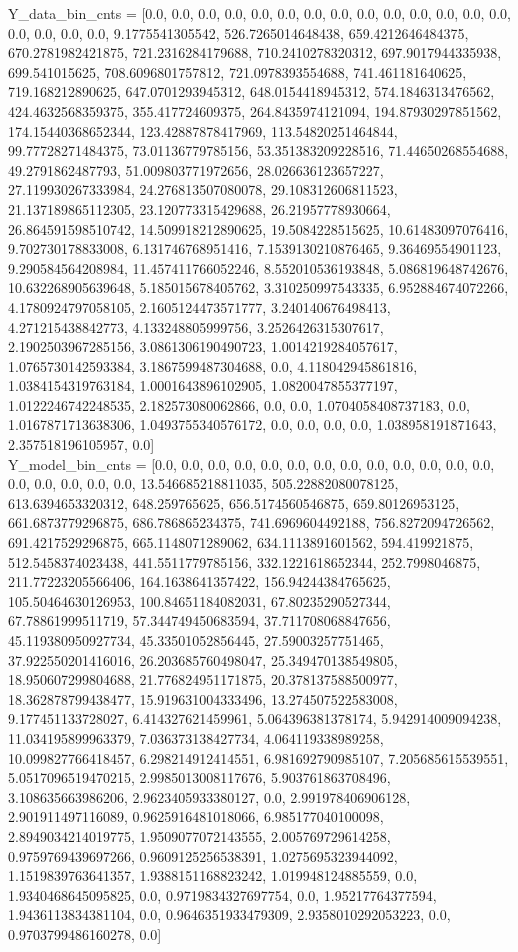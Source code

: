 \documentclass[12pt]{article}
\begin{document}
	Y\_data\_bin\_cnts = [0.0, 0.0, 0.0, 0.0, 0.0, 0.0, 0.0, 0.0, 0.0, 0.0, 0.0, 0.0, 0.0, 0.0, 0.0, 0.0, 0.0, 0.0, 9.1775541305542, 526.7265014648438, 659.4212646484375, 670.2781982421875, 721.2316284179688, 710.2410278320312, 697.9017944335938, 699.541015625, 708.6096801757812, 721.0978393554688, 741.461181640625, 719.168212890625, 647.0701293945312, 648.0154418945312, 574.1846313476562, 424.4632568359375, 355.417724609375, 264.8435974121094, 194.87930297851562, 174.15440368652344, 123.42887878417969, 113.54820251464844, 99.77728271484375, 73.01136779785156, 53.351383209228516, 71.44650268554688, 49.2791862487793, 51.009803771972656, 28.026636123657227, 27.119930267333984, 24.276813507080078, 29.108312606811523, 21.137189865112305, 23.120773315429688, 26.21957778930664, 26.864591598510742, 14.509918212890625, 19.5084228515625, 10.61483097076416, 9.702730178833008, 6.131746768951416, 7.1539130210876465, 9.36469554901123, 9.290584564208984, 11.457411766052246, 8.552010536193848, 5.086819648742676, 10.632268905639648, 5.185015678405762, 3.310250997543335, 6.952884674072266, 4.1780924797058105, 2.1605124473571777, 3.240140676498413, 4.271215438842773, 4.133248805999756, 3.2526426315307617, 2.1902503967285156, 3.0861306190490723, 1.0014219284057617, 1.0765730142593384, 3.1867599487304688, 0.0, 4.118042945861816, 1.0384154319763184, 1.0001643896102905, 1.0820047855377197, 1.0122246742248535, 2.182573080062866, 0.0, 0.0, 1.0704058408737183, 0.0, 1.0167871713638306, 1.0493755340576172, 0.0, 0.0, 0.0, 0.0, 1.038958191871643, 2.357518196105957, 0.0]\\
	Y\_model\_bin\_cnts = [0.0, 0.0, 0.0, 0.0, 0.0, 0.0, 0.0, 0.0, 0.0, 0.0, 0.0, 0.0, 0.0, 0.0, 0.0, 0.0, 0.0, 0.0, 13.546685218811035, 505.22882080078125, 613.6394653320312, 648.259765625, 656.5174560546875, 659.80126953125, 661.6873779296875, 686.786865234375, 741.6969604492188, 756.8272094726562, 691.4217529296875, 665.1148071289062, 634.1113891601562, 594.419921875, 512.5458374023438, 441.5511779785156, 332.1221618652344, 252.7998046875, 211.77223205566406, 164.1638641357422, 156.94244384765625, 105.50464630126953, 100.84651184082031, 67.80235290527344, 67.78861999511719, 57.344749450683594, 37.711708068847656, 45.119380950927734, 45.33501052856445, 27.59003257751465, 37.922550201416016, 26.203685760498047, 25.349470138549805, 18.950607299804688, 21.776824951171875, 20.378137588500977, 18.362878799438477, 15.919631004333496, 13.274507522583008, 9.177451133728027, 6.414327621459961, 5.064396381378174, 5.942914009094238, 11.034195899963379, 7.036373138427734, 4.064119338989258, 10.099827766418457, 6.298214912414551, 6.981692790985107, 7.205685615539551, 5.0517096519470215, 2.9985013008117676, 5.903761863708496, 3.108635663986206, 2.9623405933380127, 0.0, 2.991978406906128, 2.901911497116089, 0.9625916481018066, 6.985177040100098, 2.8949034214019775, 1.9509077072143555, 2.005769729614258, 0.9759769439697266, 0.9609125256538391, 1.0275695323944092, 1.1519839763641357, 1.9388151168823242, 1.019948124885559, 0.0, 1.9340468645095825, 0.0, 0.9719834327697754, 0.0, 1.95217764377594, 1.9436113834381104, 0.0, 0.9646351933479309, 2.9358010292053223, 0.0, 0.9703799486160278, 0.0]\\
\end{document}
